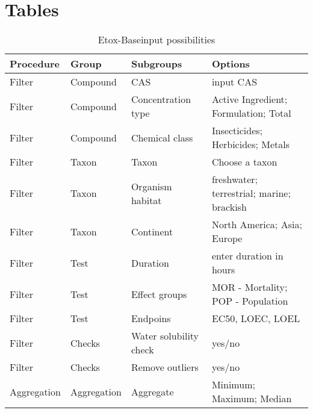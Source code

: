 \documentclass[english]{article}
\newcommand{\etoxbase}{Etox-Base}
\begin{document}
\section*{Tables}



\begin{table}[]
\begin{tabular}{|l|l|l|l|}
\hline
Procedure   & Group       & Subgroups              & Options \\ \hline
Filter      & Compound    & CAS                    & input CAS \\ \hline
Filter      & Compound    & Concentration type     & Active Ingredient; Formulation; Total \\ \hline
Filter      & Compound    & Chemical class         & Insecticides; Herbicides; Metals \\ \hline
Filter      & Taxon       & Taxon                  & Choose a taxon \\ \hline
Filter      & Taxon       & Organism habitat       & freshwater; terrestrial; marine; brackish \\ \hline
Filter      & Taxon       & Continent              & North America; Asia; Europe \\ \hline
Filter      & Test        & Duration               & enter duration in hours \\ \hline
Filter      & Test        & Effect groups          & MOR - Mortality; POP - Population \\ \hline
Filter      & Test        & Endpoins               & EC50, LOEC, LOEL \\ \hline
Filter      & Checks      & Water solubility check & yes/no \\ \hline
Filter      & Checks      & Remove outliers        & yes/no \\ \hline
Aggregation & Aggregation & Aggregate              & Minimum; Maximum; Median \\ \hline
\end{tabular}
\caption{\etoxbase input possibilities}
\label{tab:inputs}
\end{table}
\end{document}
